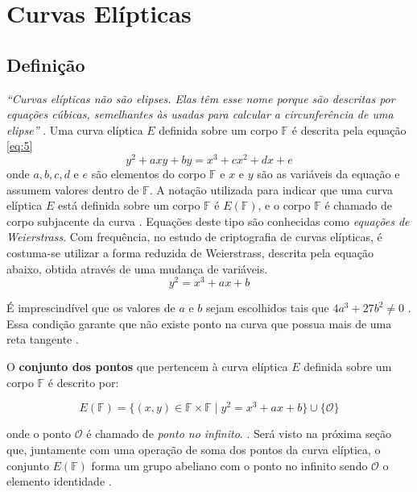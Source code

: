 %
%
\section{Curvas Elípticas}

%
%
\subsection{Definição}
\textit{``Curvas elípticas não são elipses. Elas têm esse nome porque são descritas por equações cúbicas, semelhantes às usadas para calcular a circunferência de uma elipse''} \cite{Stallings:2011}. Uma curva elíptica \(E\) definida sobre um corpo \(\mathbb{F}\) é descrita pela equação \ref{eq:5}
\begin{equation}
y^2 + axy + by = x^3 + cx^2 + dx + e \label{eq:5}
\end{equation}
onde \(a, b, c, d\) e \(e\) são elementos do corpo \(\mathbb{F}\) e \(x\) e \(y\) são as variáveis da equação e assumem valores dentro de \(\mathbb{F}\). A notação utilizada para indicar que uma curva elíptica \(E\) está definida sobre um corpo \(\mathbb{F}\) é $E(\mathbb{F})$, e o corpo \(\mathbb{F}\) é chamado de corpo subjacente da curva \cite{Guide}. Equações deste tipo são conhecidas como \textit{equações de Weierstrass}. Com frequência, no estudo de criptografia de curvas elípticas, é costuma-se utilizar a forma reduzida de Weierstrass, descrita pela equação abaixo, obtida através de uma mudança de variáveis.
\begin{equation}
y^2 = x^3 + ax + b \label{eq:6}
\end{equation}

É imprescindível que os valores de \(a\) e \(b\) sejam escolhidos tais que $4a^3 + 27b^2 \ne 0$ \cite{Mandy:2007}. Essa condição garante que não existe ponto na curva que possua mais de uma reta tangente \cite{Guide}.

O \textbf{conjunto dos pontos} que pertencem à curva elíptica \(E\) definida sobre um corpo \(\mathbb{F}\) é descrito por:

\begin{equation}
E(\mathbb{F}) = \{(x,y) \in \mathbb{F} \times \mathbb{F} \mid y^2 = x^3 + ax + b\} \cup \{\mathcal{O}\}
\label{eq:pontosCurva}
\end{equation}

onde o ponto $\mathcal{O}$ é chamado de \textit{ponto no infinito}. \cite{Mandy:2007}. Será visto na próxima seção que, juntamente com uma operação de soma dos pontos da curva elíptica, o conjunto $E(\mathbb{F})$ forma um grupo abeliano com o ponto no infinito sendo $\mathcal{O}$ o elemento identidade \cite{Guide}.

